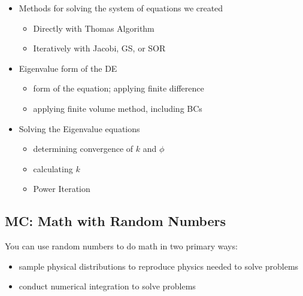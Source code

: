 \documentclass[12pt]{article}
\begin{document}
\begin{itemize}
\item Methods for solving the system of equations we created
  \begin{itemize}
  \item Directly with Thomas Algorithm
  \item Iteratively with Jacobi, GS, or SOR
  \end{itemize}

\item Eigenvalue form of the DE
  \begin{itemize}
  \item form of the equation; applying finite difference
  \item applying finite volume method, including BCs
  \end{itemize}
  
\item Solving the Eigenvalue equations
  \begin{itemize}
  \item determining convergence of $k$ and $\phi$
  \item calculating $k$
  \item Power Iteration
  \end{itemize}
\end{itemize}



\subsection*{MC: Math with Random Numbers}
You can use random numbers to do math in two primary ways: 
\begin{itemize}
\item sample physical distributions to reproduce physics needed to solve  problems
\item conduct numerical integration to solve problems
\end{itemize}
\end{document}
